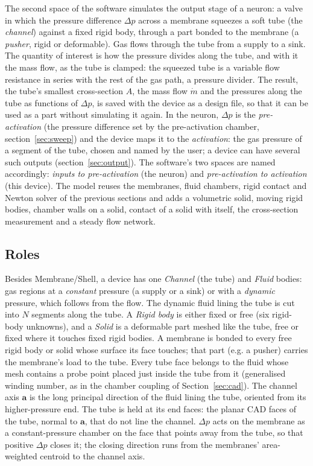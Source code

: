 \documentclass[11pt,a4paper]{article}
\theoremstyle{remark}
\begin{document}
The second space of the software simulates the output stage of a neuron: a valve in which the
pressure difference $\Delta p$ across a membrane squeezes a soft tube (the \emph{channel}) against a
fixed rigid body, through a part bonded to the membrane (a \emph{pusher}, rigid or deformable). Gas
flows through the tube from a supply to a sink. The quantity of interest is how the pressure divides
along the tube, and with it the mass flow, as the tube is clamped: the squeezed tube is a variable
flow resistance in series with the rest of the gas path, a pressure divider. The result, the tube's
smallest cross-section $A$, the mass flow $\dot m$ and the pressures along the tube as functions of
$\Delta p$, is saved with the device as a design file, so that it can be used as a part without
simulating it again. In the neuron, $\Delta p$ is the \emph{pre-activation} (the pressure difference
set by the pre-activation chamber, section~\ref{sec:sweep}) and the device maps it to the
\emph{activation}: the gas pressure of a segment of the tube, chosen and named by the user; a device can
have several such outputs (section~\ref{sec:output}). The software's two spaces are named accordingly: \emph{inputs to
pre-activation} (the neuron) and \emph{pre-activation to activation} (this device). The model reuses the membranes, fluid chambers, rigid contact and Newton solver
of the previous sections and adds a volumetric solid, moving rigid bodies, chamber walls on a solid,
contact of a solid with itself, the cross-section measurement and a steady flow network.

\subsection{Roles}
Besides Membrane/Shell, a device has one \emph{Channel} (the tube) and \emph{Fluid} bodies: gas
regions at a \emph{constant} pressure (a supply or a sink) or with a \emph{dynamic} pressure, which
follows from the flow. The dynamic fluid lining the tube is cut into $N$ segments along the tube. A
\emph{Rigid body} is either fixed or free (six rigid-body unknowns), and a \emph{Solid} is a deformable
part meshed like the tube, free or fixed where it touches fixed rigid bodies. A membrane is bonded to
every free rigid body or solid whose surface its face touches; that part (e.g. a pusher) carries the
membrane's load to the tube. Every tube face belongs to the fluid whose mesh contains a probe point
placed just inside the tube from it (generalised winding number, as in the chamber coupling of
Section~\ref{sec:cad}). The channel axis $\bm a$ is the long principal direction of the fluid lining
the tube, oriented from its higher-pressure end. The tube is held at its end faces: the planar CAD
faces of the tube, normal to $\bm a$, that do not line the channel. $\Delta p$ acts on the membrane as
a constant-pressure chamber on the face that points away from the tube, so that positive $\Delta p$
closes it; the closing direction runs from the membranes' area-weighted centroid to the channel axis.
\end{document}
